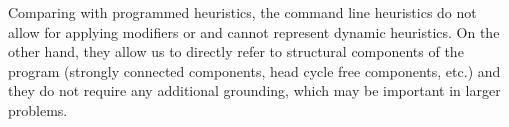Comparing with programmed heuristics, 
the command line heuristics do not allow for applying modifiers  or  
and cannot represent dynamic heuristics.
On the other hand, they allow us to directly refer to structural components of the program 
(strongly connected components, head cycle free components, etc.)
and they do not require any additional grounding, 
which may be important in larger problems.


